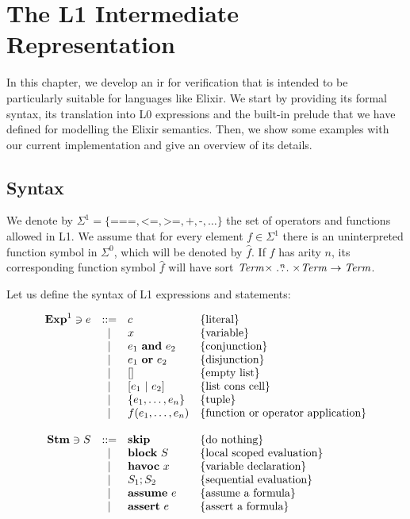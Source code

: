 \chapter{The L1 Intermediate Representation}
\label{cap:intermediateRepresentation}


In this chapter, we develop an \gls{ir} for verification that is intended to be 
particularly suitable for languages like Elixir. We start by providing its
formal syntax, its translation into L0 expressions and the built-in prelude that
we have defined for modelling the Elixir semantics.  Then, we show some examples
with our current implementation and give an overview of its details.

\section{Syntax}

We denote by $\Sigma^{1} = \{ \texttt{===}, \texttt{<=}, \texttt{>=}, 
\texttt{+}, \texttt{-}, \dots \}$ the set of operators and functions allowed in
L1. We assume that for every element $f \in \Sigma^{1}$ there is an 
uninterpreted function symbol in $\Sigma^{0}$, which will be denoted by 
$\widehat{f}$. If $f$ has arity $n$, its corresponding function symbol 
$\widehat{f}$ will have sort $\mathit{Term} \times \stackrel{n}{\dots} \times \mathit{Term}
\rightarrow \mathit{Term}$.

Let us define the syntax of L1 expressions and statements:

\[
\begin{array}{rcll}
\mathbf{Exp}^{1} \ni e & ::= & c & \{ \textrm{literal} \}\\
& | & x & \{ \textrm{variable} \}\\
& | & e_1~\textbf{and}~e_2 & \{ \textrm{conjunction} \}\\
& | & e_1~\textbf{or}~e_2 & \{ \textrm{disjunction} \}\\
& | & [] & \{ \textrm{empty list} \}\\
& | & [e_1~|~e_2] & \{ \textrm{list cons cell} \}\\
& | & \{e_1, \ldots, e_n\} & \{ \textrm{tuple} \}\\
& | & f(e_1, \ldots, e_n) & \{ \textrm{function or operator application} \}\\

\\
\mathbf{Stm} \ni S & ::= & \textbf{skip} & \{ \textrm{do nothing} \} \\
 & | & \textbf{block}~S & \{ \textrm{local scoped evaluation} \}\\
 & | & \textbf{havoc}~x & \{ \textrm{variable declaration} \}\\
 & | & S_1;S_2 & \{ \textrm{sequential evaluation} \}\\
 & | & \textbf{assume}~e & \{ \textrm{assume a formula} \}\\
 & | & \textbf{assert}~e & \{ \textrm{assert a formula} \}\\
\end{array}
\]

